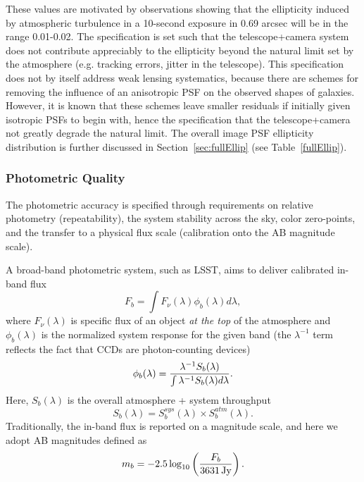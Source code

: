 These values are motivated by observations showing that the
ellipticity induced by atmospheric turbulence in a 10-second exposure
in 0.69 arcsec will be in the range 0.01-0.02.  The specification is
set such that the telescope+camera system does not contribute
appreciably to the
ellipticity beyond the natural limit set by the atmosphere (e.g. tracking
errors, jitter in the telescope).  This
specification does not by itself address weak lensing systematics,
because there are schemes for removing the influence of an anisotropic
PSF on the observed shapes of galaxies.  However, it is known that
these schemes leave smaller residuals if initially given isotropic
PSFs to begin with, hence the specification that the telescope+camera
not greatly degrade the natural limit. The overall image PSF ellipticity distribution
is further discussed in Section~\ref{sec:fullEllip} (see Table~\ref{fullEllip}).




\subsubsection{Photometric Quality}
\label{photoacc}
The photometric accuracy is
specified through requirements on relative photometry (repeatability), the
system stability across the sky, color zero-points, and the transfer to a
physical flux scale (\ie calibration onto the AB magnitude scale).

A broad-band photometric system, such as LSST, aims to
deliver calibrated in-band flux
\begin{equation}
\label{Fb}
             F_b = \int{F_\nu(\lambda) \phi_b(\lambda) d\lambda},
\end{equation}
where $F_\nu(\lambda)$ is specific flux of an object \textit{at the top} of
the atmosphere and $\phi_b(\lambda)$ is the normalized system response
for the given band (the $\lambda^{-1}$  term reflects the fact that CCDs
are photon-counting devices)
\begin{equation}
\label{PhiDef}
\phi_b(\lambda) = {\lambda^{-1} S_b(\lambda) \over \int{\lambda^{-1} S_b(\lambda) d\lambda}}.
\end{equation}
Here, $S_b(\lambda)$ is the overall atmosphere + system throughput
\begin{equation}
\label{SDef}
         S_b(\lambda) = S_b^{sys}(\lambda) \times S_b^{atm}(\lambda).
\end{equation}
Traditionally, the in-band flux is reported on a magnitude scale,
and here we adopt AB magnitudes defined as
\begin{equation}
\label{ABmag}
             m_b = -2.5\log_{10}\left({F_b \over 3631 \, \mathrm{Jy}}\right).
\end{equation}

